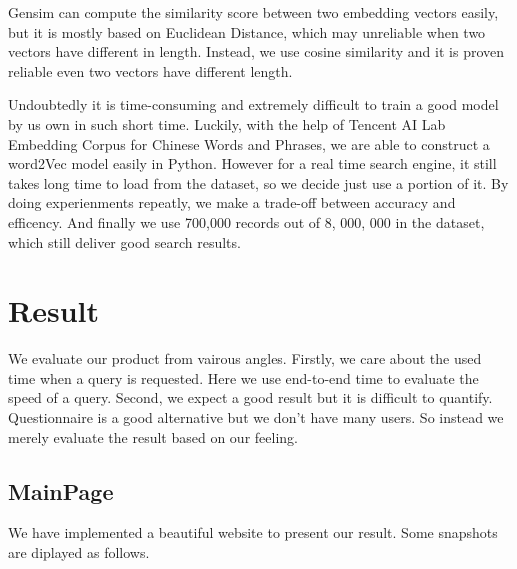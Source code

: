 \documentclass[UTF8]{article}
\begin{document}
	Gensim can compute the similarity score between two embedding vectors easily, but it is mostly based on Euclidean Distance, which may unreliable when two vectors have different in length. Instead, we use cosine similarity and it is proven reliable even two vectors have different length.
	
	Undoubtedly it is time-consuming and extremely difficult to train a good model by us own in such short time. Luckily, with the help of Tencent AI Lab Embedding Corpus for Chinese Words and Phrases, we are able to construct a word2Vec model easily in Python. However for a real time search engine, it still takes long time to load from the dataset, so we decide just use a portion of it. By doing experienments repeatly, we make a trade-off between accuracy and efficency. And finally we use 700,000 records out of 8, 000, 000 in the dataset, which still deliver good search results.
	
	
	\section{Result}
	We evaluate our product from vairous angles. Firstly, we care about the used time when a query is requested. Here we use end-to-end time to evaluate the speed of a query. Second, we expect a good result but it is difficult to quantify. Questionnaire is a good alternative but we don't have many users. So instead we merely evaluate the result based on our feeling. 
	
	\subsection{MainPage}
	We have implemented a beautiful website to present our result. Some snapshots are diplayed as follows.
\end{document}

